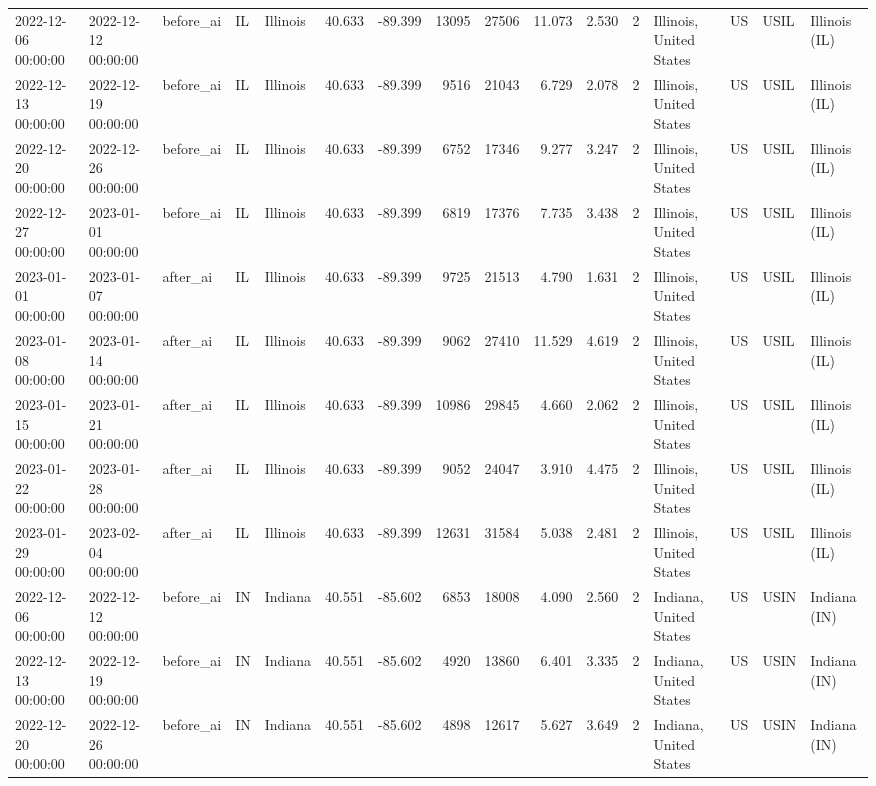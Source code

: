 \begin{tabular}{lllllrrrrrrlllll}
2022-12-06 00:00:00 & 2022-12-12 00:00:00 & before\_ai & IL & Illinois & 40.633 & -89.399 & 13095 & 27506 & 11.073 & 2.530 & 2 & Illinois, United States & US & USIL & Illinois (IL) \\
2022-12-13 00:00:00 & 2022-12-19 00:00:00 & before\_ai & IL & Illinois & 40.633 & -89.399 & 9516 & 21043 & 6.729 & 2.078 & 2 & Illinois, United States & US & USIL & Illinois (IL) \\
2022-12-20 00:00:00 & 2022-12-26 00:00:00 & before\_ai & IL & Illinois & 40.633 & -89.399 & 6752 & 17346 & 9.277 & 3.247 & 2 & Illinois, United States & US & USIL & Illinois (IL) \\
2022-12-27 00:00:00 & 2023-01-01 00:00:00 & before\_ai & IL & Illinois & 40.633 & -89.399 & 6819 & 17376 & 7.735 & 3.438 & 2 & Illinois, United States & US & USIL & Illinois (IL) \\
2023-01-01 00:00:00 & 2023-01-07 00:00:00 & after\_ai & IL & Illinois & 40.633 & -89.399 & 9725 & 21513 & 4.790 & 1.631 & 2 & Illinois, United States & US & USIL & Illinois (IL) \\
2023-01-08 00:00:00 & 2023-01-14 00:00:00 & after\_ai & IL & Illinois & 40.633 & -89.399 & 9062 & 27410 & 11.529 & 4.619 & 2 & Illinois, United States & US & USIL & Illinois (IL) \\
2023-01-15 00:00:00 & 2023-01-21 00:00:00 & after\_ai & IL & Illinois & 40.633 & -89.399 & 10986 & 29845 & 4.660 & 2.062 & 2 & Illinois, United States & US & USIL & Illinois (IL) \\
2023-01-22 00:00:00 & 2023-01-28 00:00:00 & after\_ai & IL & Illinois & 40.633 & -89.399 & 9052 & 24047 & 3.910 & 4.475 & 2 & Illinois, United States & US & USIL & Illinois (IL) \\
2023-01-29 00:00:00 & 2023-02-04 00:00:00 & after\_ai & IL & Illinois & 40.633 & -89.399 & 12631 & 31584 & 5.038 & 2.481 & 2 & Illinois, United States & US & USIL & Illinois (IL) \\
2022-12-06 00:00:00 & 2022-12-12 00:00:00 & before\_ai & IN & Indiana & 40.551 & -85.602 & 6853 & 18008 & 4.090 & 2.560 & 2 & Indiana, United States & US & USIN & Indiana (IN) \\
2022-12-13 00:00:00 & 2022-12-19 00:00:00 & before\_ai & IN & Indiana & 40.551 & -85.602 & 4920 & 13860 & 6.401 & 3.335 & 2 & Indiana, United States & US & USIN & Indiana (IN) \\
2022-12-20 00:00:00 & 2022-12-26 00:00:00 & before\_ai & IN & Indiana & 40.551 & -85.602 & 4898 & 12617 & 5.627 & 3.649 & 2 & Indiana, United States & US & USIN & Indiana (IN) \\

\end{tabular}
